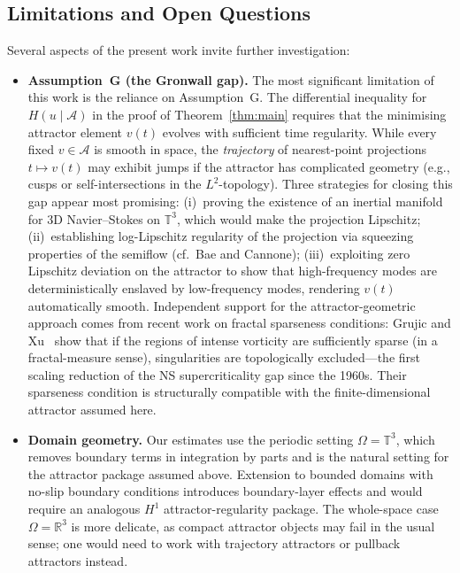 \documentclass[12pt,a4paper]{article}
\theoremstyle{definition}
\theoremstyle{plain}
\theoremstyle{remark}
\begin{document}
\subsection{Limitations and Open Questions}

Several aspects of the present work invite further investigation:

\begin{itemize}
    \item \textbf{Assumption~G (the Gronwall gap).} The most significant limitation of this work is the reliance on Assumption~G. The differential inequality for $H(u\mid\mathcal{A})$ in the proof of Theorem~\ref{thm:main} requires that the minimising attractor element $v(t)$ evolves with sufficient time regularity. While every fixed $v \in \mathcal{A}$ is smooth in space, the \emph{trajectory} of nearest-point projections $t \mapsto v(t)$ may exhibit jumps if the attractor has complicated geometry (e.g., cusps or self-intersections in the $L^2$-topology). Three strategies for closing this gap appear most promising: (i)~proving the existence of an inertial manifold for 3D Navier--Stokes on $\mathbb{T}^3$, which would make the projection Lipschitz; (ii)~establishing log-Lipschitz regularity of the projection via squeezing properties of the semiflow (cf.\ Bae and Cannone); (iii)~exploiting zero Lipschitz deviation on the attractor to show that high-frequency modes are deterministically enslaved by low-frequency modes, rendering $v(t)$ automatically smooth.
    Independent support for the attractor-geometric approach comes from recent work on fractal sparseness conditions: Grujic and Xu~\cite{GrujicXu2025} show that if the regions of intense vorticity are sufficiently sparse (in a fractal-measure sense), singularities are topologically excluded---the first scaling reduction of the NS supercriticality gap since the 1960s. Their sparseness condition is structurally compatible with the finite-dimensional attractor assumed here.

    \item \textbf{Domain geometry.} Our estimates use the periodic setting $\Omega = \mathbb{T}^3$, which removes boundary terms in integration by parts and is the natural setting for the attractor package assumed above. Extension to bounded domains with no-slip boundary conditions introduces boundary-layer effects and would require an analogous $H^1$ attractor-regularity package. The whole-space case $\Omega = \mathbb{R}^3$ is more delicate, as compact attractor objects may fail in the usual sense; one would need to work with trajectory attractors or pullback attractors instead.


\end{itemize}
\end{document}

